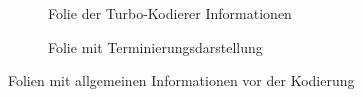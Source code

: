 \begin{figure}[th]
\centering
	\begin{subfigure}{0.45\textwidth}
	\centering
	\caption{Folie der Turbo-Kodierer Informationen}
	\label{pic:TurboCoderInformation}
	\end{subfigure}
	\qquad
	\begin{subfigure}{0.45\textwidth}
	\centering
	\caption{Folie mit Terminierungsdarstellung}
	\label{pic:TerminationEncode}
	\end{subfigure} 
\caption{Folien mit allgemeinen Informationen vor der Kodierung}
\label{pic:SlidesCommonEncode}
\end{figure}  

